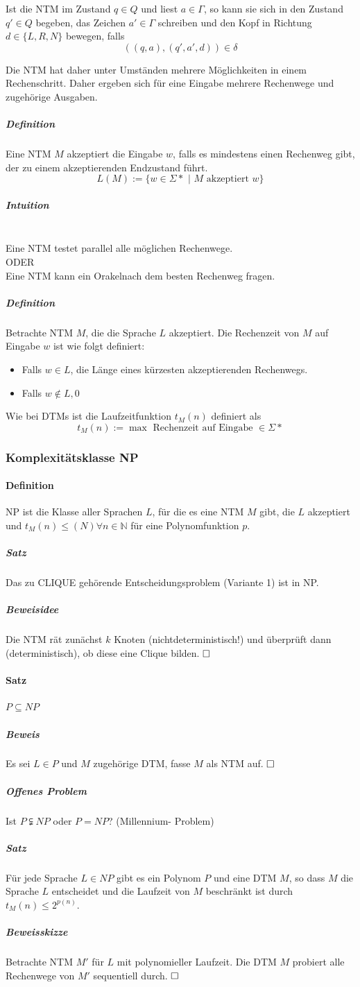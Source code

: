 \documentclass[fleqn]{scrartcl}
\begin{document}
Ist die NTM im Zustand $q \in Q$ und liest $a \in \Gamma$, so kann sie sich in den Zustand $q' \in Q$ begeben, das Zeichen $a' \in \Gamma$ schreiben und den Kopf in Richtung $d \in \{L, R, N\}$ bewegen, falls
\[((q, a), (q', a', d)) \in \delta\]

Die NTM hat daher unter Umständen mehrere Möglichkeiten in einem Rechenschritt. Daher ergeben sich für eine Eingabe mehrere Rechenwege und zugehörige Ausgaben.
\subparagraph{Definition} Eine NTM $M$ akzeptiert die Eingabe $w$, falls es mindestens einen Rechenweg gibt, der zu einem akzeptierenden Endzustand führt.
\[L(M) := \{w \in \Sigma* \,\, | \,\, M \text{ akzeptiert } w\}\]
\subparagraph{Intuition} $ $\\
Eine NTM testet parallel alle möglichen Rechenwege.\\
ODER\\
Eine NTM kann ein \glqq Orakel\grqq nach dem besten Rechenweg fragen.
\subparagraph{Definition}
Betrachte NTM $M$, die die Sprache $L$ akzeptiert. Die Rechenzeit von $M$ auf Eingabe $w$ ist wie folgt definiert:
\begin{itemize}
\item Falls $w \in L$, die Länge eines kürzesten akzeptierenden Rechenwegs.
\item Falls $w \notin L, 0$
\end{itemize}
Wie bei DTMs ist die Laufzeitfunktion $t_M(n)$ definiert als
\[t_M(n) := \max \text{ Rechenzeit auf Eingabe } \in \Sigma*\]
\subsubsection{Komplexitätsklasse NP}
\paragraph{Definition} NP ist die Klasse aller Sprachen $L$, für die es eine NTM $M$ gibt, die $L$ akzeptiert und $t_M(n) \leq(N) \forall n \in \mathbb{N}$ für eine Polynomfunktion $p$.
\subparagraph{Satz} Das zu CLIQUE gehörende Entscheidungsproblem (Variante 1) ist in NP.
\subparagraph{Beweisidee} Die NTM rät zunächst $k$ Knoten (nichtdeterministisch!) und überprüft dann (deterministisch), ob diese eine Clique bilden. $\hfill \square$
\paragraph{Satz} $P \subseteq NP$
\subparagraph{Beweis} Es sei $L \in P$ und $M$ zugehörige DTM, fasse $M$ als NTM auf. $\hfill \square$
\subparagraph{Offenes Problem} Ist $P \subsetneqq NP$ oder $P = NP$?
(Millennium- Problem)
\subparagraph{Satz} Für jede Sprache $L \in NP$ gibt es ein Polynom $P$ und eine DTM $M$, so dass $M$ die Sprache $L$ entscheidet und die Laufzeit von $M$ beschränkt ist durch $t_M (n) \leq 2^{p(n)}$.
\subparagraph{Beweisskizze} Betrachte NTM $M'$ für $L$ mit polynomieller Laufzeit. Die DTM $M$ probiert alle Rechenwege von $M'$ sequentiell durch. $\hfill \square$
\end{document}
